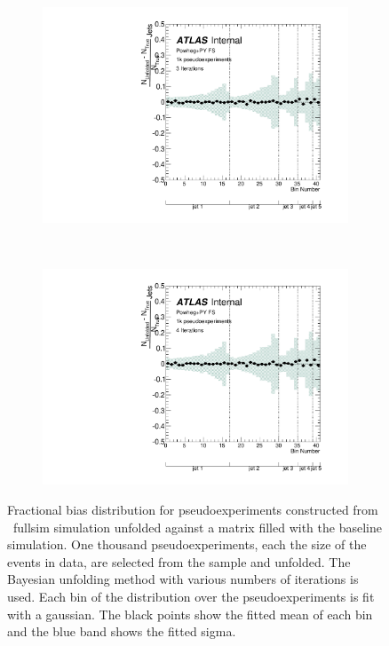\begin{figure}
\begin{subfigure}[]{0.5\textwidth}
\includegraphics[width=\textwidth]{fig/Stress/117050fullsim/FracBias3Iterations.pdf}
\end{subfigure}
~
\begin{subfigure}[]{0.5\textwidth}
\includegraphics[width=\textwidth]{fig/Stress/117050fullsim/FracBias4Iterations.pdf}
\end{subfigure}
\caption{Fractional bias distribution for pseudoexperiments constructed from \powpy\ fullsim simulation unfolded against a matrix filled with the baseline simulation. One thousand pseudoexperiments, each the size of the events in data, are selected from the sample and unfolded. The Bayesian unfolding method with various numbers of iterations is used. Each bin of the distribution over the pseudoexperiments is fit with a gaussian. The black points show the fitted mean of each bin and the blue band shows the fitted sigma.}
\label{fig:fsfrbias}
\end{figure}
